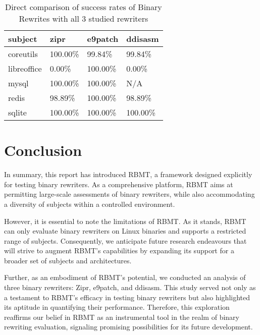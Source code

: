 \documentclass[a4paper,11pt,oneside]{report}
\begin{document}
    \begin{table}[h]
    \centering
    \caption{Direct comparison of success rates of Binary Rewrites with all 3 studied rewriters}
    \begin{tabular}{|l|l|l|l|}
    \hline
    subject & zipr & e9patch & ddisasm \\ \hline
    coreutils & 100.00\% & 99.84\% & 99.84\% \\ \hline
    libreoffice & 0.00\% & 100.00\% & 0.00\% \\ \hline
    mysql & 100.00\% & 100.00\% & N/A \\ \hline
    redis & 98.89\% & 100.00\% & 98.89\% \\ \hline
    sqlite & 100.00\% & 100.00\% & 100.00\% \\ \hline
    \end{tabular}
    \end{table}

\chapter{Conclusion}

In summary, this report has introduced RBMT, a framework designed explicitly for testing binary rewriters. 
As a comprehensive platform, RBMT aims at permitting large-scale assessments of binary rewriters, while also accommodating a 
diversity of subjects within a controlled environment.

However, it is essential to note the limitations of RBMT. As it stands, RBMT can only evaluate binary rewriters on 
Linux binaries and supports a restricted range of subjects. Consequently, we anticipate future research 
endeavours that will strive to augment RBMT's capabilities by expanding its support for a broader set of subjects and architectures.

Further, as an embodiment of RBMT's potential, we conducted an analysis of three binary rewriters: Zipr, e9patch,
and ddisasm. This study served not only as a testament to RBMT's efficacy in testing binary rewriters but also 
highlighted its aptitude in quantifying their performance. Therefore, this exploration reaffirms our belief in 
RBMT as an instrumental tool in the realm of binary rewriting evaluation, signaling promising possibilities for
its future development.

\cleardoublepage
{}
{}
\printbibliography

%
%
\end{document}
